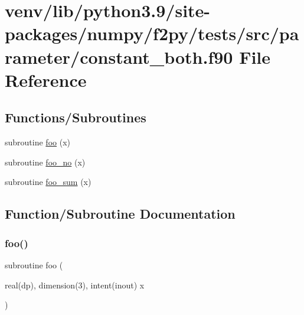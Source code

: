 \hypertarget{constant__both_8f90}{}\section{venv/lib/python3.9/site-\/packages/numpy/f2py/tests/src/parameter/constant\+\_\+both.f90 File Reference}
\label{constant__both_8f90}
\subsection*{Functions/\+Subroutines}
\begin{DoxyCompactItemize}
\item 
subroutine \hyperlink{constant__both_8f90_abaaa0b3b051492e7fb404c025c2f5f53}{foo} (x)
\item 
subroutine \hyperlink{constant__both_8f90_a133af2be40ca61a7ed31bf3a8b8968f7}{foo\+\_\+no} (x)
\item 
subroutine \hyperlink{constant__both_8f90_ac0da88a3f3be66d54ed400a9070094a3}{foo\+\_\+sum} (x)
\end{DoxyCompactItemize}


\subsection{Function/\+Subroutine Documentation}
\mbox{\label{constant__both_8f90_abaaa0b3b051492e7fb404c025c2f5f53}} 
\subsubsection{\texorpdfstring{foo()}{foo()}}
{\footnotesize\ttfamily subroutine foo (\begin{DoxyParamCaption}\item[{real(dp), dimension(3), intent(inout)}]{x }\end{DoxyParamCaption})}

\mbox{\label{constant__both_8f90_a133af2be40ca61a7ed31bf3a8b8968f7}} 
